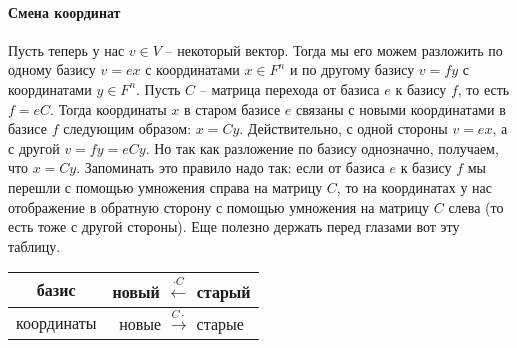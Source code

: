 \paragraph{Смена координат}

Пусть теперь у нас $v\in V$ -- некоторый вектор.
Тогда мы его можем разложить по одному базису $v = ex$ с координатами $x\in F^n$ и по другому базису $v = f y$ с координатами $y \in F^n$.
Пусть $C$ -- матрица перехода от базиса $e$ к базису $f$, то есть $f = e C$.
Тогда координаты $x$ в старом базисе $e$ связаны с новыми координатами в базисе $f$ следующим образом: $x = Cy$.
Действительно, с одной стороны $v = ex$, а с другой $v = f y = eC y$.
Но так как разложение по базису однозначно, получаем, что $x = Cy$.
Запоминать это правило надо так: если от базиса $e$ к базису $f$ мы перешли с помощью умножения справа на матрицу $C$, то на координатах у нас отображение в обратную сторону с помощью умножения на матрицу $C$ слева (то есть тоже с другой стороны).
Еще полезно держать перед глазами вот эту таблицу.
\begin{center}
\begin{tabular}{c|c}
{базис}&{новый $\stackrel{\cdot C}{\longleftarrow}$ старый}\\
\hline
{координаты}&{новые $\stackrel{C\cdot}{\longrightarrow}$ старые}\\
\end{tabular}
\end{center}

